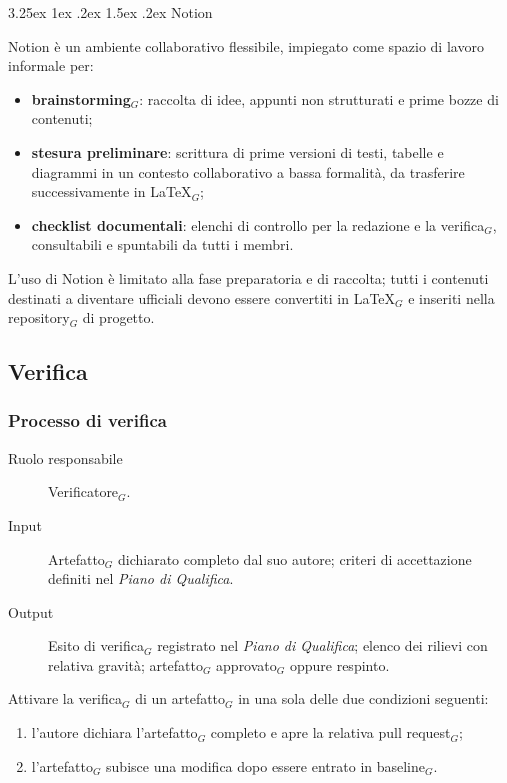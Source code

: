 \documentclass[a4paper, 10pt]{article}
\makeatletter
\renewcommand\paragraph{\@startsection{paragraph}{4}{\z@}%
  {3.25ex \@plus1ex \@minus .2ex}%
  {1.5ex \@plus .2ex}%
  {\normalfont\normalsize\bfseries}}
\makeatother
\begin{document}
\paragraph{Notion}

Notion è un ambiente collaborativo flessibile, impiegato come spazio di lavoro informale per:
\begin{itemize}
    \item \textbf{brainstorming$_G$}: raccolta di idee, appunti non strutturati e prime bozze di contenuti;
    \item \textbf{stesura preliminare}: scrittura di prime versioni di testi, tabelle e diagrammi in un contesto collaborativo a bassa formalità, da trasferire successivamente in \LaTeX$_G$;
    \item \textbf{checklist documentali}: elenchi di controllo per la redazione e la verifica$_G$, consultabili e spuntabili da tutti i membri.
\end{itemize}

L'uso di Notion è limitato alla fase preparatoria e di raccolta; tutti i contenuti destinati a diventare ufficiali devono essere convertiti in \LaTeX$_G$ e inseriti nella repository$_G$ di progetto.

\subsection{Verifica}
\label{subsec:verifica}

\subsubsection{Processo di verifica}

\begin{description}
    \item[Ruolo responsabile] Verificatore$_G$.
    \item[Input] Artefatto$_G$ dichiarato completo dal suo autore; criteri di accettazione definiti nel \emph{Piano di Qualifica}.
    \item[Output] Esito di verifica$_G$ registrato nel \emph{Piano di Qualifica}; elenco dei rilievi con relativa gravità; artefatto$_G$ approvato$_G$ oppure respinto.
\end{description}

\noindent Attivare la verifica$_G$ di un artefatto$_G$ in una sola delle due condizioni seguenti:
\begin{enumerate}
    \item l'autore dichiara l'artefatto$_G$ completo e apre la relativa pull request$_G$;
    \item l'artefatto$_G$ subisce una modifica dopo essere entrato in baseline$_G$.
\end{enumerate}
\end{document}
